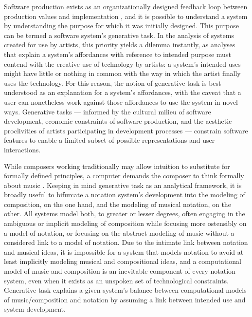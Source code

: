\documentclass{article}
\begin{document}
Software production exists as an organizationally designed feedback loop
between production values and implementation \cite{Derniame:1999fk}, and it is
possible to understand a system by understanding the purpose for which it was
initially designed. This purpose can be termed a software system's generative task. In the analysis of
systems created for use by artists, this priority yields a dilemma instantly,
as analyses that explain a system's affordances with reference to intended
purpose must contend with the creative use of technology by artists: a system's
intended uses might have little or nothing in common with the way in which the
artist finally uses the technology. For this reason, the notion of generative
task is best understood as an explanation for a system's affordances, with the
caveat that a user can nonetheless work against those affordances to use the
system in novel ways. Generative tasks --- informed by the cultural milieu of
software development, economic constraints of software production, and the
aesthetic proclivities of artists participating in development processes ---
constrain software features to enable a limited subset of possible
representations and user interactions.

While composers working traditionally may allow intuition to substitute for
formally defined principles, a computer demands the composer to think formally
about music \cite{Xenakis:1992rq}. Keeping in mind generative task as an
analytical framework, it is broadly useful to bifurcate a  notation
system's development into the modeling of composition, on the one
hand, and the modeling of musical notation, on the other. All systems model
both, to greater or lesser degrees, often engaging in the ambiguous or implicit
modeling of composition while focusing more ostensibly on a model of
notation, or focusing on the abstract modeling of music without a considered
link to a model of notation. Due to the intimate link between notation and
musical ideas, it is impossible for a system that models notation to avoid at
least implicitly modeling musical and compositional ideas, and a computational
model of music and composition is an inevitable component of every
notation system, even when it exists as an unspoken set of technological
constraints. Generative task explains a given system's balance between
computational models of music/composition and notation by assuming a link
between intended use and system development.
\end{document}
